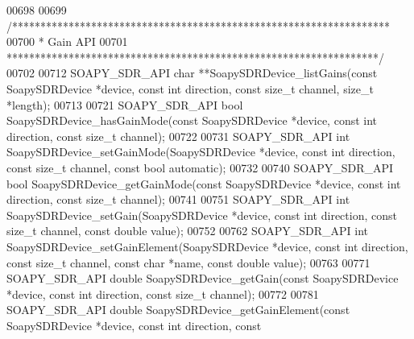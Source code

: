 \begin{DoxyCode}
00698 
00699 \textcolor{comment}{/*******************************************************************}
00700 \textcolor{comment}{ * Gain API}
00701 \textcolor{comment}{ ******************************************************************/}
00702 
00712 SOAPY_SDR_API \textcolor{keywordtype}{char} **SoapySDRDevice_listGains(\textcolor{keyword}{const} SoapySDRDevice *device, \textcolor{keyword}{const} \textcolor{keywordtype}{int} direction, \textcolor{keyword}{const} \textcolor{keywordtype}{
      size\_t} channel, \textcolor{keywordtype}{size\_t} *length);
00713 
00721 SOAPY_SDR_API \textcolor{keywordtype}{bool} SoapySDRDevice_hasGainMode(\textcolor{keyword}{const} SoapySDRDevice *device, \textcolor{keyword}{const} \textcolor{keywordtype}{int} direction, \textcolor{keyword}{const} \textcolor{keywordtype}{
      size\_t} channel);
00722 
00731 SOAPY_SDR_API \textcolor{keywordtype}{int} SoapySDRDevice_setGainMode(SoapySDRDevice *device, \textcolor{keyword}{const} \textcolor{keywordtype}{int} direction, \textcolor{keyword}{const} \textcolor{keywordtype}{size\_t} 
      channel, \textcolor{keyword}{const} \textcolor{keywordtype}{bool} automatic);
00732 
00740 SOAPY_SDR_API \textcolor{keywordtype}{bool} SoapySDRDevice_getGainMode(\textcolor{keyword}{const} SoapySDRDevice *device, \textcolor{keyword}{const} \textcolor{keywordtype}{int} direction, \textcolor{keyword}{const} \textcolor{keywordtype}{
      size\_t} channel);
00741 
00751 SOAPY_SDR_API \textcolor{keywordtype}{int} SoapySDRDevice_setGain(SoapySDRDevice *device, \textcolor{keyword}{const} \textcolor{keywordtype}{int} direction, \textcolor{keyword}{const} \textcolor{keywordtype}{size\_t} channel,
       \textcolor{keyword}{const} \textcolor{keywordtype}{double} value);
00752 
00762 SOAPY_SDR_API \textcolor{keywordtype}{int} SoapySDRDevice_setGainElement(SoapySDRDevice *device, \textcolor{keyword}{const} \textcolor{keywordtype}{int} direction, \textcolor{keyword}{const} \textcolor{keywordtype}{size\_t} 
      channel, \textcolor{keyword}{const} \textcolor{keywordtype}{char} *name, \textcolor{keyword}{const} \textcolor{keywordtype}{double} value);
00763 
00771 SOAPY_SDR_API \textcolor{keywordtype}{double} SoapySDRDevice_getGain(\textcolor{keyword}{const} SoapySDRDevice *device, \textcolor{keyword}{const} \textcolor{keywordtype}{int} direction, \textcolor{keyword}{const} \textcolor{keywordtype}{size\_t}
       channel);
00772 
00781 SOAPY_SDR_API \textcolor{keywordtype}{double} SoapySDRDevice_getGainElement(\textcolor{keyword}{const} SoapySDRDevice *device, \textcolor{keyword}{const} \textcolor{keywordtype}{int} direction, \textcolor{keyword}{const}

\end{DoxyCode}
